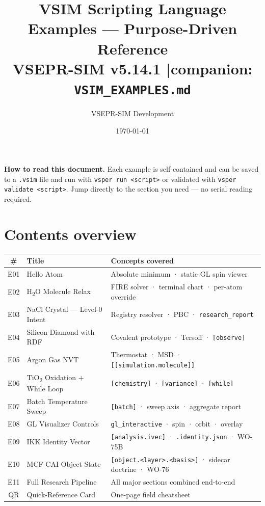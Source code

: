\documentclass[11pt,a4paper]{article}
\title{%
  {\Huge\bfseries\color{vsimblue} VSIM Scripting Language}\\[6pt]
  {\large Examples — Purpose-Driven Reference}\\[3pt]
	{\normalsize VSEPR-SIM v5.14.1 \quad|\quad companion: \texttt{VSIM\_EXAMPLES.md}}%
}
\author{VSEPR-SIM Development}
\date{\today}
\begin{document}
\maketitle
\thispagestyle{empty}

\begin{mdframed}[linecolor=vsimrule, backgroundcolor=vsimltgrey,
				 skipabove=4pt, skipbelow=4pt]
\textbf{How to read this document.}
Each example is self-contained and can be saved to a \texttt{.vsim} file and
run with \texttt{vsper run <script>} or validated with
\texttt{vsper validate <script>}.
Jump directly to the section you need — no serial reading required.
\end{mdframed}

\tableofcontents
\clearpage

\section*{Contents overview}

\begin{center}
\footnotesize
\begin{tabular}{@{}clp{8cm}@{}}
\toprule
\textbf{\#} & \textbf{Title} & \textbf{Concepts covered} \\
\midrule
E01 & Hello Atom              & Absolute minimum · static GL spin viewer \\
E02 & H\textsubscript{2}O Molecule Relax
							  & FIRE solver · terminal chart · per-atom override \\
E03 & NaCl Crystal --- Level-0 Intent
							  & Registry resolver · PBC · \texttt{research\_report} \\
E04 & Silicon Diamond with RDF
							  & Covalent prototype · Tersoff · \texttt{[observe]} \\
E05 & Argon Gas NVT           & Thermostat · MSD · \texttt{[[simulation.molecule]]} \\
E06 & TiO\textsubscript{2} Oxidation + While Loop
							  & \texttt{[chemistry]} · \texttt{[variance]} · \texttt{[while]} \\
E07 & Batch Temperature Sweep & \texttt{[batch]} · sweep axis · aggregate report \\
E08 & GL Visualizer Controls  & \texttt{gl\_interactive} · spin · orbit · overlay \\
E09 & IKK Identity Vector     & \texttt{[analysis.ivec]} · \texttt{.identity.json} · WO-75B \\
E10 & MCF-CAI Object State    & \texttt{[object.<layer>.<basis>]} · sidecar doctrine · WO-76 \\
E11 & Full Research Pipeline  & All major sections combined end-to-end \\
QR  & Quick-Reference Card    & One-page field cheatsheet \\
\bottomrule
\end{tabular}
\end{center}
\end{document}
